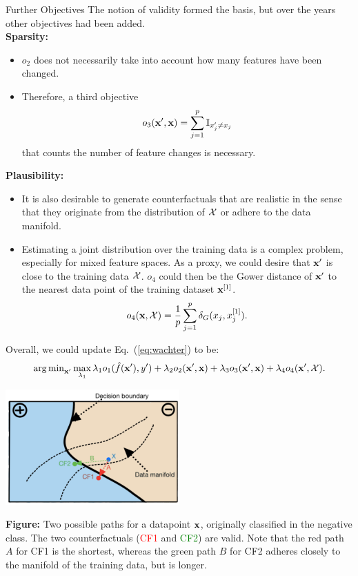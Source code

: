 \documentclass[11pt,compress,t,notes=noshow, xcolor=table]{beamer}
\begin{document}
\begin{vbframe}{Further Objectives}
	The notion of validity formed the basis, but over the years other objectives had been added. \\
	\textbf{Sparsity:}
	\begin{itemize}
		\item $o_2$ does not necessarily take into account how many features have been changed. 
		\item Therefore, a third objective $$o_3(\xv', \xv) = \sum_{j = 1}^p \mathbb{I}_{x'_j \neq x_j}$$ that counts the number of feature changes is necessary. 
	\end{itemize}
	\textbf{Plausibility:}
	\begin{itemize}
		\item It is also desirable to generate counterfactuals that are realistic in the sense that they originate from the distribution of $\Xspace$ or adhere to the data manifold. 
		\item Estimating a joint distribution over the training data is a complex problem, especially for mixed feature spaces. As a proxy, we could desire that $\xv'$ is close to the training data $\Xspace$. $o_4$ could then be the Gower distance of $\xv'$ to the nearest data point of the training dataset $\xv^{[1]}$. 
		$$o_4(\xv, \Xspace) =  \frac{1}{p} \sum_{j = 1}^{p}  \delta_G(x_j, x^{[1]}_j).$$
	\end{itemize}	
	Overall, we could update Eq.~(\ref{eq:wachter}) to be: 
	\begin{equation}
		\argmin_{\xv'} \max_{\lambda_1} \lambda_1 o_1(\fh(\xv'), y') + \lambda_2 o_2(\xv', \xv) + \lambda_3 o_3(\xv', \xv) + \lambda_4 o_4(\xv', \Xspace).
	\end{equation}
	
	\begin{center}
		\includegraphics[width=0.5\textwidth]{figure/counterfactuals_obj}
	\end{center}

\scriptsize{\textbf{Figure:} Two possible paths for a datapoint \textcolor{blue}{$\xv$},
	originally classified in the negative class. The two counterfactuals (\textcolor{red}{CF1} and \textcolor{green}{CF2}) are valid. Note that the red path $A$ for CF1 is the shortest, whereas the
	green path $B$ for CF2 adheres closely to the manifold of the training data, but is longer.}

\end{vbframe}
\end{document}
